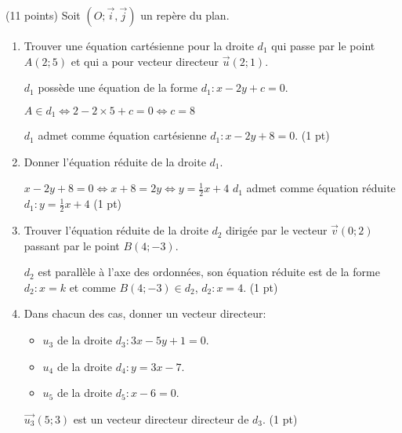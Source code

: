 \documentclass[a4paper,11pt]{article}
\theoremstyle{break}
\begin{document}
   \begin{exo}(11 points)
   Soit $(O;\vec{i},\vec{j})$ un repère du plan.
   \begin{enumerate}
    \item Trouver une équation cartésienne pour la droite $d_1$ qui passe par le point $A(2;5)$ 
    et qui a pour vecteur directeur $\vec{u}(2;1)$. 

\begin{correction}
    
   $d_1$ poss\`ede une \'equation de la forme $d_1:x-2y+c=0$.
   
   $A \in d_1 \Leftrightarrow 2-2 \times 5+c=0 \Leftrightarrow c=8$
   
   $d_1$ admet comme \'equation cart\'esienne $d_1:x-2y+8=0$. (1 pt)

\end{correction}    
    
    \item Donner l'équation réduite de la droite $d_1$.

\begin{correction}
    
 $x-2y+8=0 \Leftrightarrow x+8=2y \Leftrightarrow y=\frac{1}{2}x+4$
   $d_1$ admet comme \'equation r\'eduite $d_1:y=\frac{1}{2}x+4$ (1 pt)

\end{correction}
   
    \item Trouver l'équation réduite de la droite $d_2$ dirigée par le vecteur $\vec{v}(0;2)$ 
    passant par le point $B(4;-3)$.
    
\begin{correction}
 $d_2$ est parall\`ele \`a l'axe des ordonn\'ees, son \'equation r\'eduite est de la forme $d_2:x=k$ et comme $B(4;-3) \in d_2$,
 $d_2:x=4$. (1 pt)
\end{correction}
   
    \item Dans chacun des cas, donner un vecteur directeur:
    
    \begin{itemize}
    \item $u_3$ de la droite $d_3:3x-5y+1=0$.
    \item $u_4$ de la droite $d_4:y=3x-7$.
    \item $u_5$ de la droite $d_5:x-6=0$.
     
    \end{itemize}

    
\begin{correction}
 $\vec{u_3}(5;3)$ est un vecteur directeur directeur de $d_3$. (1 pt)
 

\end{correction}
\end{enumerate}
\end{exo}
\end{document}
